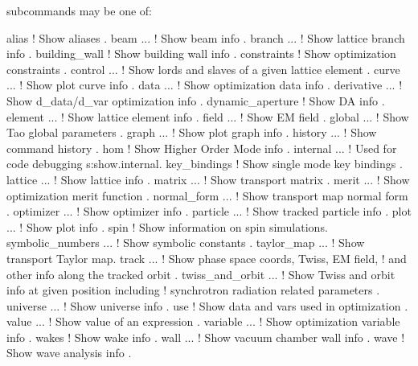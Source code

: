 {{{{{{{ subcommands may be one of:
\begin{example}
  alias                 ! Show aliases .
  beam ...              ! Show beam info .
  branch ...            ! Show lattice branch info .
  building_wall         ! Show building wall info .
  constraints           ! Show optimization constraints .
  control ...           ! Show lords and slaves of a given lattice element .
  curve ...             ! Show plot curve info .
  data ...              ! Show optimization data info .
  derivative ...        ! Show d_data/d_var optimization info .
  dynamic_aperture      ! Show DA info .
  element ...           ! Show lattice element info .
  field ...             ! Show EM field .
  global ...            ! Show Tao global parameters .
  graph ...             ! Show plot graph info .
  history ...           ! Show command history .
  hom                   ! Show Higher Order Mode info .
  internal ...          ! Used for code debugging {s:show.internal}.
  key_bindings          ! Show single mode key bindings .
  lattice ...           ! Show lattice info .
  matrix ...            ! Show transport matrix .
  merit ...             ! Show optimization merit function .
  normal_form ...       ! Show transport map normal form .
  optimizer ...         ! Show optimizer info .
  particle ...          ! Show tracked particle info .
  plot ...              ! Show plot info .
  spin                  ! Show information on spin simulations.
  symbolic_numbers ...  ! Show symbolic constants .
  taylor_map ...        ! Show transport Taylor map.
  track ...             ! Show phase space coords, Twiss, EM field, 
                        !   and other info along the tracked orbit .
  twiss_and_orbit ...   ! Show Twiss and orbit info at given position including
                        !   synchrotron radiation related parameters .
  universe ...          ! Show universe info .
  use                   ! Show data and vars used in optimization .
  value ...             ! Show value of an expression .
  variable ...          ! Show optimization variable info .
  wakes                 ! Show wake info .
  wall ...              ! Show vacuum chamber wall info .
  wave                  ! Show wave analysis info .
\end{example}

}}}}}}}
